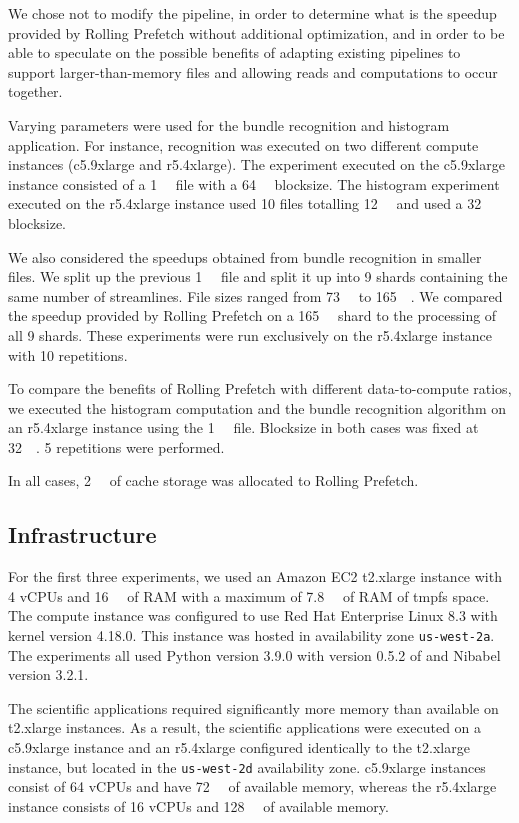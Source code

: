 \documentclass[conference]{IEEEtran}
\begin{document}
We chose not to modify the pipeline, in order to determine what is the speedup provided
by Rolling Prefetch without additional optimization, and in order to be able to speculate on the possible benefits of adapting existing pipelines
to support larger-than-memory files and allowing reads and computations to occur together.

Varying parameters were used for the bundle recognition and
histogram application. For instance, recognition was
executed on two different compute instances (c5.9xlarge and r5.4xlarge). The experiment executed on the c5.9xlarge instance consisted of a \SI{1}{\gibi\byte} file with a \SI{64}{\mebi\byte} blocksize. The histogram experiment executed on the r5.4xlarge instance used 10 files totalling \SI{12}{\gibi\byte} and used a \SI{32}{\mebi\byte} blocksize. 

We also considered the speedups obtained from
bundle recognition in smaller files. We split up the 
previous \SI{1}{\gibi\byte} file and split it up into
9 shards containing the same number of streamlines. File sizes ranged from \SI{73}{\gibi\byte} to \SI{165}{\mebi\byte}. We compared the speedup provided by Rolling Prefetch on a \SI{165}{\mebi\byte} shard to
the processing of all 9 shards. These experiments were
run exclusively on the r5.4xlarge instance with 10 repetitions.

To compare the benefits of Rolling Prefetch with different data-to-compute ratios, we executed the histogram computation and the bundle recognition algorithm on
an r5.4xlarge instance using the \SI{1}{\gibi\byte} file. Blocksize in both cases was fixed at \SI{32}{\mebi\byte}. 5 repetitions were performed.

In all cases, \SI{2}{\gibi\byte} of cache storage was allocated to Rolling Prefetch.

\subsection{Infrastructure}

For the first three experiments, we used an Amazon EC2 t2.xlarge instance with 4 vCPUs and \SI{16}{\gibi\byte} of RAM with a
maximum of \SI{7.8}{\gibi\byte} of RAM of tmpfs space. The compute instance was configured to use Red Hat Enterprise
Linux 8.3 with kernel version 4.18.0. This instance was hosted in availability zone \texttt{us-west-2a}.
The experiments all used Python version 3.9.0 with version 0.5.2 of \sfs and Nibabel version 3.2.1.

The scientific applications required significantly more memory than available on t2.xlarge instances. As a result, the scientific applications were executed on a c5.9xlarge instance and an r5.4xlarge configured identically
to the t2.xlarge instance, but located in the \texttt{us-west-2d} availability zone. c5.9xlarge instances consist of 64 vCPUs and have \SI{72}{\gibi\byte} of available memory, whereas the r5.4xlarge instance consists of 16 vCPUs and \SI{128}{\gibi\byte} of available memory. 
\end{document}
